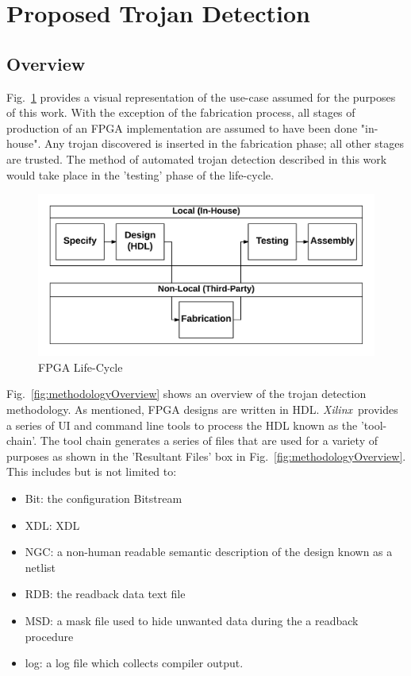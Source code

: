 \documentclass[conference]{IEEEtran}
\newcommand{\Xilinx}{\textit{\gls{Xilinx}}~}
\begin{document}
\section{Proposed Trojan Detection} \label{sec:methodolgy}

\subsection{Overview}
Fig.~\ref{fig:Concept} provides a visual representation of the use-case assumed for the purposes of this work. 
With the exception of the fabrication process, all stages of production of an \acrshort{FPGA} implementation are assumed to have been done "in-house". 
Any trojan discovered is inserted in the fabrication phase; all other stages are trusted.  
The method of automated trojan detection described in this work would take place in the 'testing' phase of the life-cycle. 
\begin{figure}[h]
	\centering
	\includegraphics[width=1\linewidth]{Figures/Concept}
	\caption[FPGA Life-Cycle]{FPGA Life-Cycle}
	\label{fig:Concept}
\end{figure}
Fig.~\ref{fig:methodologyOverview} shows an overview of the trojan detection methodology.
As mentioned, \acrshort{FPGA} designs are written in \acrshort{HDL}.
\Xilinx provides a series of \acrfull{UI} and command line tools to process the \acrshort{HDL} known as the 'tool-chain'.
The tool chain generates a series of files that are used for a variety of purposes as shown in the 'Resultant Files' box in Fig.~\ref{fig:methodologyOverview}.
This includes but is not limited to:
\begin{itemize}
	\item Bit: the configuration \gls{Bitstream}
	\item \acrshort{XDL}: \acrfull{XDL}
	\item NGC: a non-human readable semantic description of the design known as a netlist
	\item RDB: the readback data text file
	\item MSD: a mask file used to hide unwanted data during the a readback procedure
	\item log: a log file which collects compiler output.
\end{itemize}
\end{document}
